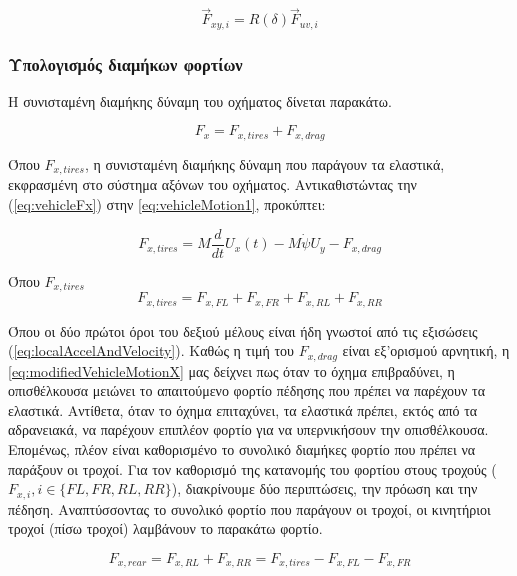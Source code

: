 \begin{equation}
    \vec{F}_{xy,i} = R(\delta)\vec{F}_{uv,i}
    \label{eq:tyreForcesTransformation}
\end{equation}

\subsubsection{Υπολογισμός διαμήκων φορτίων}
\noindent
Η συνισταμένη διαμήκης δύναμη του οχήματος δίνεται παρακάτω.

\begin{equation}
    F_x = F_{x,tires} + F_{x,drag}
    \label{eq:vehicleFx}    
\end{equation}

\noindent
Όπου $F_{x,tires}$, η συνισταμένη διαμήκης δύναμη που παράγουν τα ελαστικά, εκφρασμένη στο σύστημα αξόνων του οχήματος. Αντικαθιστώντας την (\ref{eq:vehicleFx}) στην \cref{eq:vehicleMotion1}, προκύπτει:

\begin{equation}
    F_{x,tires} = M\dfrac{d}{dt}U_x(t) - M\dot{\psi} U_y - F_{x,drag}
    \label{eq:modifiedVehicleMotionX}
\end{equation}

\noindent
Όπου $F_{x,tires}$
\begin{equation}
   F_{x,tires} = F_{x,FL} +  F_{x,FR} +F_{x,RL} +F_{x,RR}
   \label{eq:tyreTotalFx}
\end{equation}

\noindent
Όπου οι δύο πρώτοι όροι του δεξιού μέλους είναι ήδη γνωστοί από τις εξισώσεις (\ref{eq:localAccelAndVelocity}). Καθώς η τιμή του $F_{x,drag}$ είναι εξ'ορισμού αρνητική, η \cref{eq:modifiedVehicleMotionX} μας δείχνει πως όταν το όχημα επιβραδύνει, η οπισθέλκουσα μειώνει το απαιτούμενο φορτίο πέδησης που πρέπει να παρέχουν τα ελαστικά. Αντίθετα, όταν το όχημα επιταχύνει, τα ελαστικά πρέπει, εκτός από τα αδρανειακά, να παρέχουν επιπλέον φορτίο για να υπερνικήσουν την οπισθέλκουσα.\\[6pt]

\noindent
Επομένως, πλέον είναι καθορισμένο το συνολικό διαμήκες φορτίο που πρέπει να παράξουν οι τροχοί. Για τον καθορισμό της κατανομής του φορτίου στους τροχούς ($F_{x,i}, i\in \{FL, FR, RL, RR\}$), διακρίνουμε δύο περιπτώσεις, την πρόωση και την πέδηση. 
Αναπτύσσοντας το συνολικό φορτίο που παράγουν οι τροχοί, οι κινητήριοι τροχοί (πίσω τροχοί) λαμβάνουν το παρακάτω φορτίο.

\begin{equation}
    F_{x,rear} = F_{x,RL} + F_{x,RR} = F_{x,tires} - F_{x,FL} - F_{x,FR}
    \label{eq:rearTractiveForce}
\end{equation}

